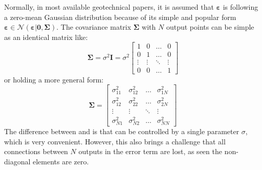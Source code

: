 \documentclass{ol-softwaremanual}
\begin{document}
Normally, in most available geotechnical papers, it is assumed that $\boldsymbol{\varepsilon}$ is following a zero-mean Gaussian distribution because of its simple and popular form $\boldsymbol{\varepsilon} \in \mathcal{N}(\boldsymbol{\varepsilon}|\boldsymbol{0},\boldsymbol{\Sigma})$. The covariance matrix $\boldsymbol{\Sigma}$ with $N$ output points can be simple as an identical matrix like:
\begin{equation}
\label{eq: iid_general_discrepancy}
\boldsymbol{\Sigma} = \sigma^2 \boldsymbol{I}=
\sigma^2
  \begin{bmatrix}
1 & 0 & \hdots & 0 \\
0 & 1 & \hdots & 0 \\
\vdots & \vdots & \ddots & \vdots \\
0 & 0 & \hdots & 1 
\end{bmatrix}   
\end{equation}
or holding a more general form:
\begin{equation}
\label{eq: general_discrepancy}
\boldsymbol{\Sigma} = 
  \begin{bmatrix}
\sigma_{11}^2 & \sigma_{12}^2 & \hdots      & \sigma_{1N}^2 \\
\sigma_{12}^2 & \sigma_{22}^2 & \hdots      & \sigma_{2N}^2 \\
\vdots      & \vdots      & \ddots      & \vdots \\
\sigma_{N1}^2 & \sigma_{N2}^2 & \hdots      & \sigma_{NN}^2
\end{bmatrix}    
\end{equation}
The difference between  and  is that  can be controlled by a single parameter $\sigma$, which is very convenient. However, this also brings a challenge that all connections between $N$ outputs in the error term are lost, as seen the non-diagonal elements are zero.
\end{document}

